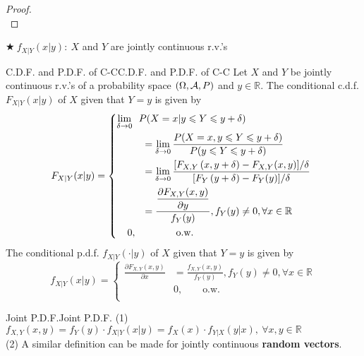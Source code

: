 \documentclass{elegantbook}
\begin{document}
\begin{proof}
\\[4cm]\vspace{0.01cm}
\end{proof}

\(\bigstar\ f_{X|Y}(x|y):\ X\) and \(Y\) are jointly continuous r.v.'s

\begin{definition}{C.D.F. and P.D.F. of C-C}{C.D.F. and P.D.F. of C-C}
Let \(X\) and \(Y\) be jointly continuous r.v.'s of a probability
space $(\Omega,\mathcal{A}, P)$ and \(y \in \mathbb{R}\). The conditional c.d.f. \(F_{X|Y}(x|y)\) of \(X\) given that \(Y = y\) is given by
\[F_{X|Y}(x|y) = \left\{ \begin{aligned}
\lim_{\delta \rightarrow 0}&\ \ {P( X = x | y \leqslant Y \leqslant y + \delta )}\\ 
&\quad= \lim_{\delta \rightarrow 0}\frac{P( X = x,y \leqslant Y \leqslant y + \delta)}{P( y \leqslant Y \leqslant y + \delta)} \\
&\quad= \lim_{\delta \rightarrow 0}\frac{\lbrack F_{X,Y}\left( x,y + \delta \right) - F_{X,Y}(x,y)\rbrack/\delta}{\lbrack F_{Y}\left( y + \delta \right) - F_{Y}(y)\rbrack/\delta} \\
&\quad= \dfrac{\dfrac{\partial F_{X,Y}(x,y)}{\partial y}}{f_{Y}(y)},f_{Y}(y) \neq 0,\forall x \in \mathbb{R} \\
0&, \qquad\qquad\mathrm{\text{o.w.}} \\
\end{aligned} \right.\ \]
The conditional p.d.f. \(f_{X|Y}\left( \cdot | y \right)\) of \(X\) given that \(Y = y\) is given by
\[f_{X|Y}(x|y) = \left\{ \begin{aligned}
\frac{\partial F_{X,Y}(x,y)}{\partial x} &= \frac{f_{X,Y}(x,y)}{f_{Y}(y)},f_{Y}(y) \neq 0,\forall x \in \mathbb{R} \\
&0,\qquad\mathrm{\text{o.w.}} \\
\end{aligned} \right.\]
\end{definition}

\begin{remark}{Joint P.D.F.}{Joint P.D.F.}
(1) \(f_{X,Y}(x,y) = f_{Y}(y) \cdot f_{X|Y}(x|y) = f_{X}(x) \cdot f_{Y|X}(y|x),\ \forall x,y \in \mathbb{R}\)\\
(2) A similar def\/inition can be made for jointly continuous \textbf{random vectors}.
\end{remark}
\end{document}
